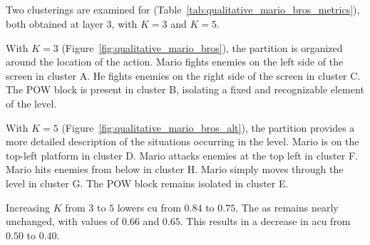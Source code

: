 \cleartoleftpage
\subsection{\MarioBrosName}

Two clusterings are examined for \MarioBrosName (Table~\ref{tab:qualitative_mario_bros_metrics}), both obtained at layer 3, with $K=3$ and $K=5$.

With $K=3$ (Figure~\ref{fig:qualitative_mario_bros}), the partition is organized around the location of the action.
Mario fights enemies on the left side of the screen in cluster A.
He fights enemies on the right side of the screen in cluster C.
The POW block is present in cluster B, isolating a fixed and recognizable element of the level.

With $K=5$ (Figure~\ref{fig:qualitative_mario_bros_alt}), the partition provides a more detailed description of the situations occurring in the level.
Mario is on the top-left platform in cluster D.
Mario attacks enemies at the top left in cluster F.
Mario hits enemies from below in cluster H.
Mario simply moves through the level in cluster G.
The POW block remains isolated in cluster E.

Increasing $K$ from $3$ to $5$ lowers \gls{cu} from $0.84$ to $0.75$.
The \gls{as} remains nearly unchanged, with values of $0.66$ and $0.65$.
This results in a decrease in \gls{acu} from $0.50$ to $0.40$.

